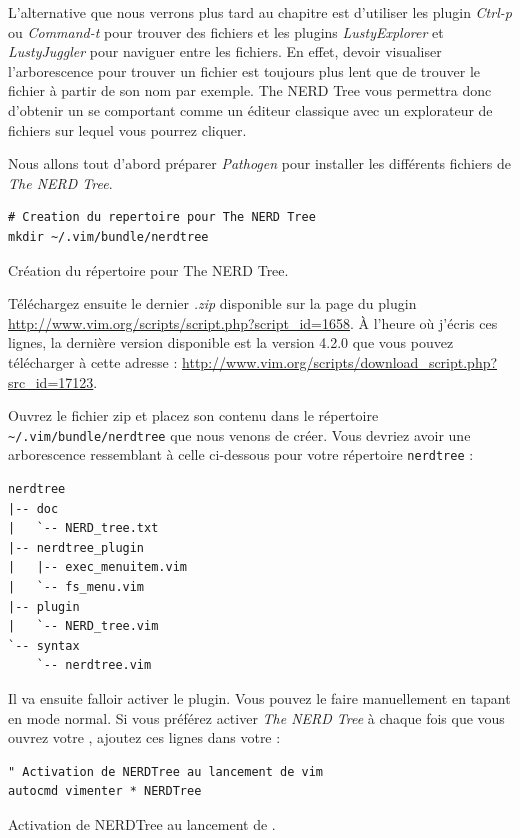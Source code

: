 L'alternative que nous verrons plus tard au chapitre  est d'utiliser les plugin \emph{Ctrl-p} ou \emph{Command-t} pour trouver des fichiers et les plugins \emph{LustyExplorer} et \emph{LustyJuggler} pour naviguer entre les fichiers. En effet, devoir visualiser l'arborescence pour trouver un fichier est toujours plus lent que de trouver le fichier à partir de son nom par exemple. The NERD Tree vous permettra donc d'obtenir un \vim se comportant comme un éditeur classique avec un explorateur de fichiers sur lequel vous pourrez cliquer.

Nous allons tout d'abord préparer \emph{Pathogen} pour installer les différents fichiers de \emph{The NERD Tree}.

\begin{listing}[H]
\begin{verbatim}
# Creation du repertoire pour The NERD Tree
mkdir ~/.vim/bundle/nerdtree
\end{verbatim}
  \caption{Création du répertoire pour The NERD Tree.}
  \label{code:nerdtree-bundle}
\end{listing}

Téléchargez ensuite le dernier \emph{.zip} disponible sur la page du plugin \url{http://www.vim.org/scripts/script.php?script_id=1658}. À l'heure où j'écris ces lignes, la dernière version disponible est la version 4.2.0 que vous pouvez télécharger à cette adresse : \url{http://www.vim.org/scripts/download_script.php?src_id=17123}.

Ouvrez le fichier zip et placez son contenu dans le répertoire \Verb|~/.vim/bundle/nerdtree| que nous venons de créer. Vous devriez avoir une arborescence ressemblant à celle ci-dessous pour votre répertoire \Verb|nerdtree| :

\begin{verbatim}
nerdtree
|-- doc
|   `-- NERD_tree.txt
|-- nerdtree_plugin
|   |-- exec_menuitem.vim
|   `-- fs_menu.vim
|-- plugin
|   `-- NERD_tree.vim
`-- syntax
    `-- nerdtree.vim
\end{verbatim}

Il va ensuite falloir activer le plugin. Vous pouvez le faire manuellement en tapant  en mode normal. Si vous préférez activer \emph{The NERD Tree} à chaque fois que vous ouvrez votre \vim, ajoutez ces lignes dans votre \vimrc:

\begin{listing}[H]
\begin{verbatim}
" Activation de NERDTree au lancement de vim
autocmd vimenter * NERDTree
\end{verbatim}
\caption{Activation de NERDTree au lancement de \vim.}
\label{code:nerdtreee}
\end{listing}

